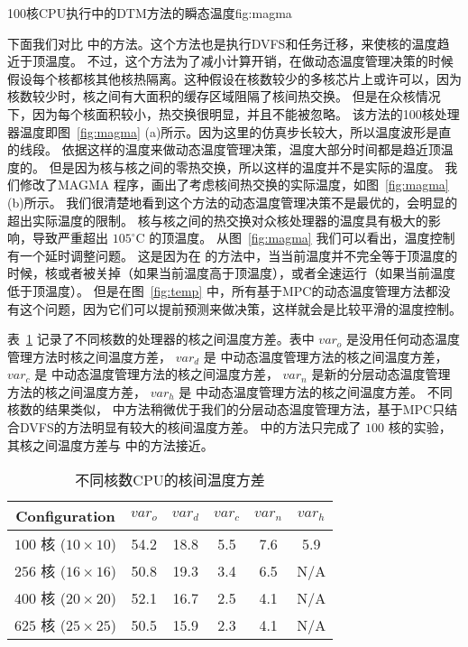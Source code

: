 \begin{pics}{100核CPU执行\cite{Hanumaiah:TCAD'11}中的DTM方法的瞬态温度}{fig:magma}
 \end{pics}
下面我们对比 \cite{Hanumaiah:TCAD'11} 中的方法。这个方法也是执行DVFS和任务迁移，来使核的温度趋近于顶温度。
不过，这个方法为了减小计算开销，在做动态温度管理决策的时候假设每个核都核其他核热隔离。这种假设在核数较少的多核芯片上或许可以，因为核数较少时，核之间有大面积的缓存区域阻隔了核间热交换。
但是在众核情况下，因为每个核面积较小，热交换很明显，并且不能被忽略。
该方法的100核处理器温度即图~\ref{fig:magma} (a)所示。因为这里的仿真步长较大，所以温度波形是直的线段。
依据这样的温度来做动态温度管理决策，温度大部分时间都是趋近顶温度的。
但是因为核与核之间的零热交换，所以这样的温度并不是实际的温度。
我们修改了MAGMA 程序，画出了考虑核间热交换的实际温度，如图~\ref{fig:magma} (b)所示。
我们很清楚地看到这个方法的动态温度管理决策不是最优的，会明显的超出实际温度的限制。
核与核之间的热交换对众核处理器的温度具有极大的影响，导致严重超出 $105^{\circ}$C 的顶温度。
从图~\ref{fig:magma} 我们可以看出，温度控制有一个延时调整问题。
这是因为在 \cite{Hanumaiah:TCAD'11} 的方法中，当当前温度并不完全等于顶温度的时候，核或者被关掉（如果当前温度高于顶温度），或者全速运行（如果当前温度低于顶温度）。
但是在图~\ref{fig:temp} 中，所有基于MPC的动态温度管理方法都没有这个问题，因为它们可以提前预测来做决策，这样就会是比较平滑的温度控制。


表~\ref{tab:var} 记录了不同核数的处理器的核之间温度方差。表中 $var_o$ 是没用任何动态温度管理方法时核之间温度方差，
$var_d$ 是 \cite{Zanini:ECCTD'09} 中动态温度管理方法的核之间温度方差，
$var_c$ 是 \cite{MaWang:APCCAS'14} 中动态温度管理方法的核之间温度方差，
$var_n$ 是新的分层动态温度管理方法的核之间温度方差，
$var_h$ 是 \cite{Hanumaiah:TCAD'11} 中动态温度管理方法的核之间温度方差。
不同核数的结果类似， \cite{MaWang:APCCAS'14} 中方法稍微优于我们的分层动态温度管理方法，基于MPC只结合DVFS的方法明显有较大的核间温度方差。
\cite{Hanumaiah:TCAD'11} 中的方法只完成了 $100$ 核的实验，其核之间温度方差与 \cite{MaWang:APCCAS'14} 中的方法接近。\\
\begin{table}[H]
\centering
 \caption{不同核数CPU的核间温度方差 \label{tab:var}}{
 \begin{tabular}{|c|c|c|c|c|c|}
 \hline
 \hline
 Configuration  & $var_o$ & $var_d$ & $var_c$ & $var_n$ & $var_h$ \\
 \hline 
 \hline
 $100$ 核 ($10 \times 10$) & 54.2 & 18.8 & 5.5 & 7.6 & 5.9\\

 \hline
 $256$ 核 ($16 \times 16$) & 50.8 & 19.3 & 3.4 & 6.5 & N/A\\
 \hline
 $400$ 核 ($20 \times 20$) & 52.1 & 16.7 & 2.5 & 4.1 & N/A\\
 \hline
 $625$ 核 ($25 \times 25$) & 50.5 & 15.9 & 2.3 & 4.1 & N/A\\
 \hline
 \hline
 \end{tabular}}
 \end{table}
 
